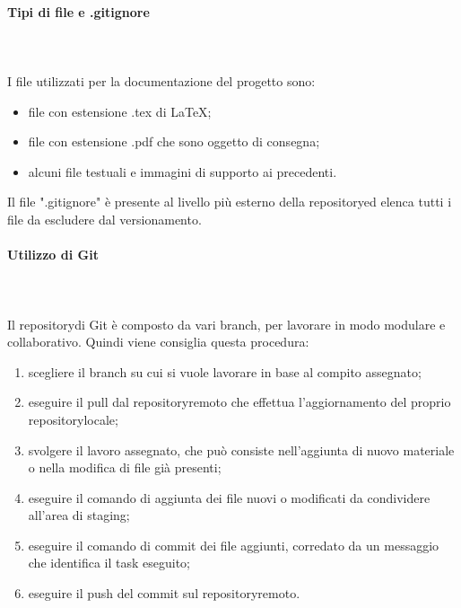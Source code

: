 	\paragraph{Tipi di file e .gitignore} \mbox{}\\ \mbox{}\\
	I file utilizzati per la documentazione del progetto sono:
	\begin{itemize}
		\item file con estensione .tex di \LaTeX{};
		\item file con estensione .pdf che sono oggetto di consegna;
		\item alcuni file testuali e immagini di supporto ai precedenti.
	\end{itemize}			
	Il file ".gitignore" è presente al livello più esterno della repository\glosp ed elenca tutti i file da escludere dal versionamento. 
	\paragraph{Utilizzo di Git} \mbox{}\\ \mbox{}\\
	Il repository\glosp di Git è composto da vari branch, per lavorare in modo modulare e collaborativo.  
	Quindi viene consiglia questa procedura:
	\begin{enumerate}
		\item scegliere il branch su cui si vuole lavorare in base al compito assegnato;
		\item eseguire il pull dal repository\glosp remoto che effettua l'aggiornamento del proprio repository\glosp locale;
		\item svolgere il lavoro assegnato, che può consiste nell'aggiunta di nuovo materiale o nella modifica di file già presenti;
		\item eseguire il comando di aggiunta dei file nuovi o modificati da condividere all'area di staging\glo;
		\item eseguire il comando di commit dei file aggiunti, corredato da un messaggio che identifica il task eseguito;
		\item eseguire il push del commit sul repository\glosp remoto.
	\end{enumerate}
